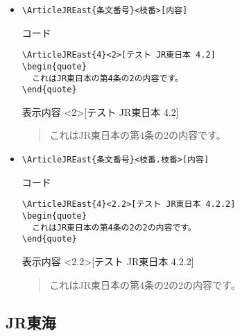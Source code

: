 \documentclass[oneside,10pt,a4paper]{jsarticle}
\begin{document}
\begin{itemize}
\begin{itembox}[l]{表示内容}
        \begin{quote}
          これはJR東日本の第4条の内容です。
        \end{quote}
      \end{itembox}
    \item \verb|\ArticleJREast{条文番号}<枝番>[内容]|
      \begin{itembox}[l]{コード}
        {\footnotesize\begin{verbatim}
\ArticleJREast{4}<2>[テスト JR東日本 4.2]
\begin{quote}
  これはJR東日本の第4条の2の内容です。
\end{quote}\end{verbatim}}
      \end{itembox}
      \begin{itembox}[l]{表示内容}
        <2>[テスト JR東日本 4.2]
        \begin{quote}
          これはJR東日本の第4条の2の内容です。
        \end{quote}
      \end{itembox}
    \item \verb|\ArticleJREast{条文番号}<枝番.枝番>[内容]|
      \begin{itembox}[l]{コード}
        {\footnotesize\begin{verbatim}
\ArticleJREast{4}<2.2>[テスト JR東日本 4.2.2]
\begin{quote}
  これはJR東日本の第4条の2の2の内容です。
\end{quote}\end{verbatim}}
      \end{itembox}
      \begin{itembox}[l]{表示内容}
        <2.2>[テスト JR東日本 4.2.2]
        \begin{quote}
          これはJR東日本の第4条の2の2の内容です。
        \end{quote}
      \end{itembox}
  \end{itemize}

  \newpage

  \subsection{JR東海}
\end{document}
